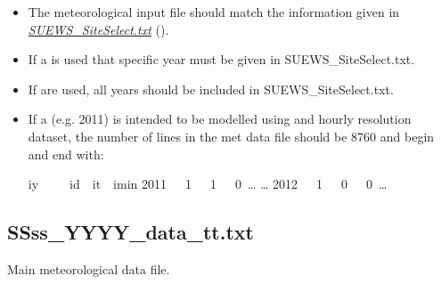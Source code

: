 \documentclass[letterpaper,10pt,english]{sphinxmanual}
\begin{document}
\begin{itemize}
\item {} 
The meteorological input file should match the information given in
{\hyperref[\detokenize{input_files/met_input:SUEWS_SiteSelect.txt}]{\emph{SUEWS\_SiteSelect.txt}}} ().

\item {} 
If a  is used that specific year must be given in
SUEWS\_SiteSelect.txt.

\item {} 
If  are used, all years should be included in
SUEWS\_SiteSelect.txt.

\item {} 
If a  (e.g. 2011) is intended to be modelled using and
hourly resolution dataset, the number of lines in the met data file
should be 8760 and begin and end with:

%
\begin{sphinxVerbatim}[commandchars=\\\{\}]
iy     id  it  imin
2011   1   1   0 …
…
2012   1   0   0 …
\end{sphinxVerbatim}

\end{itemize}


\subsection{SSss\_YYYY\_data\_tt.txt}
\label{\detokenize{input_files/met_input:ssss-yyyy-data-tt-txt}}\label{\detokenize{input_files/met_input:id1}}
Main meteorological data file.
\end{document}
